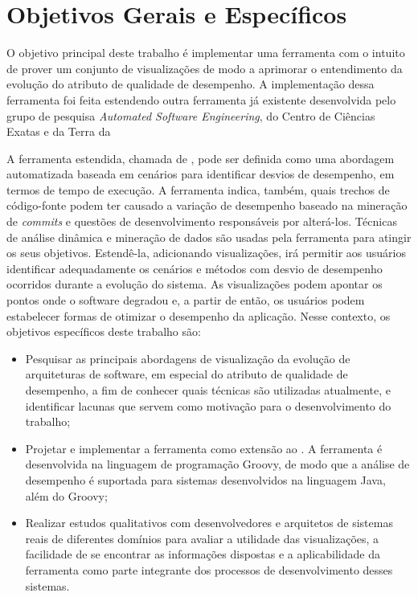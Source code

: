 
\section{Objetivos Gerais e Específicos} \label{sec:objetivos-gerais-especificos}

O objetivo principal deste trabalho é implementar uma ferramenta com o intuito de prover um conjunto de visualizações de modo a aprimorar o entendimento da evolução do atributo de qualidade de desempenho. A implementação dessa ferramenta foi feita estendendo outra ferramenta já existente desenvolvida pelo grupo de pesquisa \textit{Automated Software Engineering}, do Centro de Ciências Exatas e da Terra da 

A ferramenta estendida, chamada de \textit{\perfMinerName} \cite{Pinto2015}, pode ser definida como uma abordagem automatizada baseada em cenários para identificar desvios de desempenho, em termos de tempo de execução. A ferramenta indica, também, quais trechos de código-fonte podem ter causado a variação de desempenho baseado na mineração de \textit{commits} e questões de desenvolvimento responsáveis por alterá-los. Técnicas de análise dinâmica e mineração de dados são usadas pela ferramenta para atingir os seus objetivos. Estendê-la, adicionando visualizações, irá permitir aos usuários identificar adequadamente os cenários e métodos com desvio de desempenho ocorridos durante a evolução do sistema. As visualizações podem apontar os pontos onde o software degradou e, a partir de então, os usuários podem estabelecer formas de otimizar o desempenho da aplicação. Nesse contexto, os objetivos específicos deste trabalho são:
\begin{itemize}
	\item Pesquisar as principais abordagens de visualização da evolução de arquiteturas de software, em especial do atributo de qualidade de desempenho, a fim de conhecer quais técnicas são utilizadas atualmente, e identificar lacunas que servem como motivação para o desenvolvimento do trabalho;
	\item Projetar e implementar a ferramenta \textit{{\toolName}} como extensão ao \textit{\perfMinerName}. A ferramenta é desenvolvida na linguagem de programação Groovy, de modo que a análise de desempenho é suportada para sistemas desenvolvidos na linguagem Java, além do Groovy;
	\item Realizar estudos qualitativos com desenvolvedores e arquitetos de sistemas reais de diferentes domínios para avaliar a utilidade das visualizações, a facilidade de se encontrar as informações dispostas e a aplicabilidade da ferramenta como parte integrante dos processos de desenvolvimento desses sistemas.
\end{itemize}

